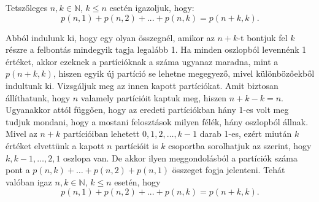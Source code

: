 \begin{problem}
Tetszőleges $n,k\in\mathbb{N}$, $k\leq n$ esetén igazoljuk, hogy:
\[
p(n,1)+p(n,2)+...+p(n,k)=p(n+k,k).
\]
\end{problem}
\begin{solution}
Abból indulunk ki, hogy egy olyan összegnél, amikor az $n+k$-t bontjuk
fel $k$ részre a felbontás mindegyik tagja legalább 1. Ha minden
oszlopból levennénk 1 értéket, akkor ezeknek a partícióknak a száma
ugyanaz maradna, mint a $p(n+k,k)$, hiszen egyik új partíció se lehetne
megegyező, mivel különbözőekből indultunk ki. Vizsgáljuk meg az innen
kapott partíciókat. Amit biztosan állíthatunk, hogy $n$ valamely
partícióit kaptuk meg, hiszen $n+k-k=n$. Ugyanakkor attól függően,
hogy az eredeti partíciókban hány 1-es volt meg tudjuk mondani, hogy
a mostani felosztások milyen félék, hány oszlopból állnak. Mivel az
$n+k$ partícióiban lehetett $0,1,2,\dots,k-1$ darab 1-es, ezért
miután $k$ értéket elvettünk a kapott $n$ partícióit is $k$ csoportba
sorolhatjuk az szerint, hogy $k,k-1,\dots,2,1$ oszlopa van. De akkor
ilyen meggondolásból a partíciók száma pont a $p(n,k)+\dots+p(n,2)+p(n,1)$
összeget fogja jelenteni. Tehát valóban igaz $n,k\in\mathbb{N}$,
$k\leq n$ esetén, hogy 
\[
p(n,1)+p(n,2)+...+p(n,k)=p(n+k,k).
\]
\end{solution}

